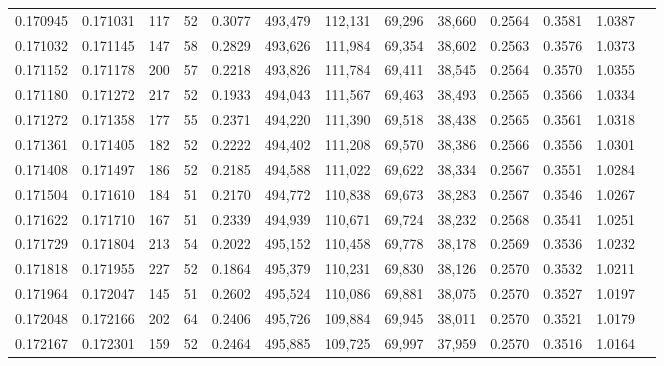 \begin{tabular}{rrrrrrrrrrrrr}
0.170945 & 0.171031 &   117 &  52 &                                     0.3077 & 493,479 & 112,131 &  69,296 &  38,660 & 0.2564 & 0.3581 & 1.0387 \\
0.171032 & 0.171145 &   147 &  58 &                                     0.2829 & 493,626 & 111,984 &  69,354 &  38,602 & 0.2563 & 0.3576 & 1.0373 \\
0.171152 & 0.171178 &   200 &  57 &                                     0.2218 & 493,826 & 111,784 &  69,411 &  38,545 & 0.2564 & 0.3570 & 1.0355 \\
0.171180 & 0.171272 &   217 &  52 &                                     0.1933 & 494,043 & 111,567 &  69,463 &  38,493 & 0.2565 & 0.3566 & 1.0334 \\
0.171272 & 0.171358 &   177 &  55 &                                     0.2371 & 494,220 & 111,390 &  69,518 &  38,438 & 0.2565 & 0.3561 & 1.0318 \\
0.171361 & 0.171405 &   182 &  52 &                                     0.2222 & 494,402 & 111,208 &  69,570 &  38,386 & 0.2566 & 0.3556 & 1.0301 \\
0.171408 & 0.171497 &   186 &  52 &                                     0.2185 & 494,588 & 111,022 &  69,622 &  38,334 & 0.2567 & 0.3551 & 1.0284 \\
0.171504 & 0.171610 &   184 &  51 &                                     0.2170 & 494,772 & 110,838 &  69,673 &  38,283 & 0.2567 & 0.3546 & 1.0267 \\
0.171622 & 0.171710 &   167 &  51 &                                     0.2339 & 494,939 & 110,671 &  69,724 &  38,232 & 0.2568 & 0.3541 & 1.0251 \\
0.171729 & 0.171804 &   213 &  54 &                                     0.2022 & 495,152 & 110,458 &  69,778 &  38,178 & 0.2569 & 0.3536 & 1.0232 \\
0.171818 & 0.171955 &   227 &  52 &                                     0.1864 & 495,379 & 110,231 &  69,830 &  38,126 & 0.2570 & 0.3532 & 1.0211 \\
0.171964 & 0.172047 &   145 &  51 &                                     0.2602 & 495,524 & 110,086 &  69,881 &  38,075 & 0.2570 & 0.3527 & 1.0197 \\
0.172048 & 0.172166 &   202 &  64 &                                     0.2406 & 495,726 & 109,884 &  69,945 &  38,011 & 0.2570 & 0.3521 & 1.0179 \\
0.172167 & 0.172301 &   159 &  52 &                                     0.2464 & 495,885 & 109,725 &  69,997 &  37,959 & 0.2570 & 0.3516 & 1.0164 \\

\end{tabular}
